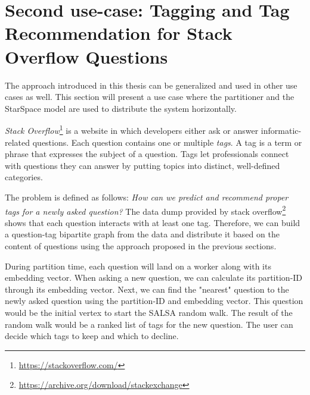 \section{Second use-case: Tagging and Tag Recommendation for Stack Overflow Questions}
\label{sec:second-usecase}
The approach introduced in this thesis can be generalized and used in other use cases as well. This section will present a use case where the partitioner and the StarSpace model are used to distribute the system horizontally.


\emph{Stack Overflow}\footnote{\url{https://stackoverflow.com/}} is a website in which developers either ask or answer informatic-related questions. Each question contains one or multiple \emph{tags}. A tag is a term or phrase that expresses the subject of a question. Tags let professionals connect with questions they can answer by putting topics into distinct, well-defined categories.


The problem is defined as follows: \emph{How can we predict and recommend proper tags for a newly asked question?} The data dump provided by stack overflow\footnote{\url{https://archive.org/download/stackexchange}} shows that each question interacts with at least one tag. Therefore, we can build a question-tag bipartite graph from the data and distribute it based on the content of questions using the approach proposed in the previous sections.


During partition time, each question will land on a worker along with its embedding vector. When asking a new question, we can calculate its partition-ID through its embedding vector. Next, we can find the "nearest" question to the newly asked question using the partition-ID and embedding vector. This question would be the initial vertex to start the SALSA random walk. The result of the random walk would be a ranked list of tags for the new question. The user can decide which tags to keep and which to decline.

